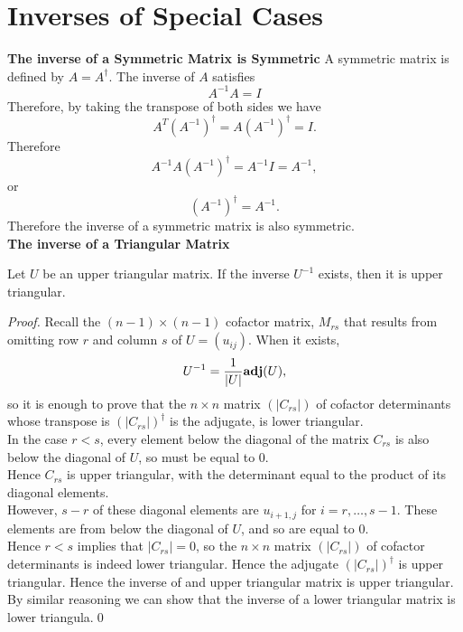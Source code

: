 \section{Inverses of Special Cases}

{\bf The inverse of a Symmetric Matrix is Symmetric}
A symmetric matrix is defined by $A = A^\dagger$. The inverse of $A$ satisfies
\[ A^{-1} A = I \] Therefore, by taking the transpose of both sides we have
\[ A^T (A^{-1})^\dagger = A (A^{-1})^\dagger = I.\]Therefore
\[ A^{-1} A (A^{-1})^\dagger = A^{-1} I = A^{-1},\] or
\[(A^{-1})^\dagger = A^{-1}.\]Therefore the inverse of a symmetric matrix is also symmetric. \\

{\bf The inverse of a Triangular Matrix}
\begin{theorem}
Let $U$ be an upper triangular matrix. If the inverse $U^{-1}$ exists, then it is upper triangular.
\end{theorem}
\begin{proof}
Recall the $(n-1)\times(n-1)$ cofactor matrix, $M_{rs}$ that results from omitting row $r$ and column $s$ of $U = (u_{ij})$.
When it exists, \[ U^{-1} = {1\over|U|}{\bf adj}(U),\] so it is enough to prove that the $n \times n$ matrix $(|C_{rs}|)$ of cofactor determinants whose transpose
is $(|C_{rs}|)^\dagger$ is the adjugate, is lower triangular.\\

In the case $r < s$, every element below the diagonal of the matrix $C_{rs}$ is also below the diagonal of $U$, so must be equal to $0$.\\

Hence $C_{rs}$ is upper triangular, with the determinant equal to the product of its diagonal elements.\\

However, $s-r$ of these diagonal elements are $u_{i+1,j}$ for $i=r,\hdots,s-1$. These elements are from below the diagonal of $U$, and so are equal to $0$. \\

Hence $r < s$ implies that $|C_{rs}| = 0$, so the $n\times n$ matrix $(|C_{rs}|)$ of cofactor determinants is indeed lower triangular. Hence the adjugate
$(|C_{rs}|)^\dagger$ is upper triangular. Hence the inverse of and upper triangular matrix is upper triangular. By similar reasoning we can show that the
inverse of a lower triangular matrix is lower triangula.\qed
\end{proof}